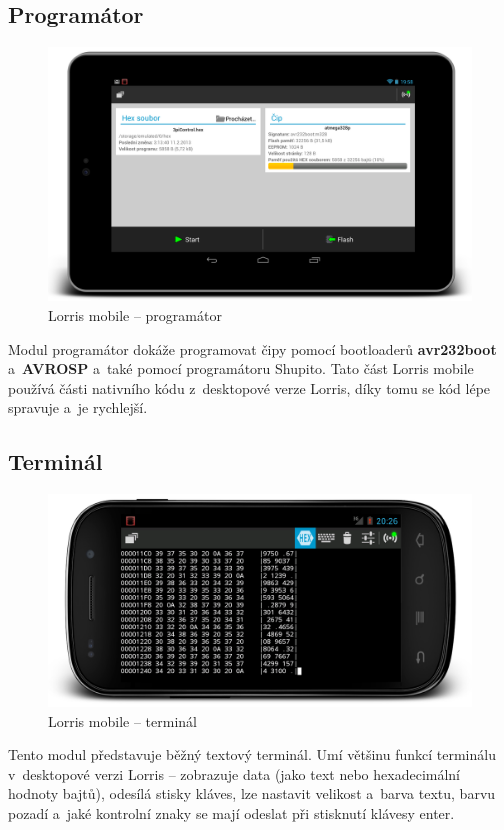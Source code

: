 \documentclass[12pt, a4paper, oneside]{article}
\begin{document}
\subsection{Programátor}
\begin{figure}[H]
\begin{center}
\includegraphics[width=\textwidth]{img/mobile_programmer.png}
\caption{Lorris mobile -- programátor}
\end{center}
\end{figure}
Modul programátor dokáže programovat čipy pomocí bootloaderů {\bf avr232boot} a~{\bf AVROSP} a~také pomocí programátoru Shupito.
Tato část Lorris mobile používá části nativního kódu z~desktopové verze Lorris, díky tomu se kód lépe spravuje a~je rychlejší.

\subsection{Terminál}
\begin{figure}[H]
\begin{center}
\includegraphics[width=\textwidth]{img/mobile_term.png}
\caption{Lorris mobile -- terminál}
\end{center}
\end{figure}
Tento modul představuje běžný textový terminál. Umí většinu funkcí terminálu v~desktopové verzi Lorris -- zobrazuje data (jako text nebo hexadecimální hodnoty bajtů), odesílá stisky kláves, lze nastavit velikost a~barva textu, barvu pozadí a~jaké kontrolní znaky se mají odeslat při stisknutí klávesy enter. 
\end{document}
